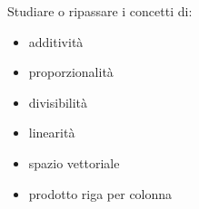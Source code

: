 \documentclass{beamer}
\begin{document}
\generatitolo

\begin{frame}{\approfondimenti}
Studiare o ripassare i concetti di:
\begin{itemize}
 \item additivit\`a
 \item proporzionalit\`a
 \item divisibilit\`a
 \item linearit\`a
 \item spazio vettoriale
 \item prodotto riga per colonna
\end{itemize}

\end{frame}
\end{document}
